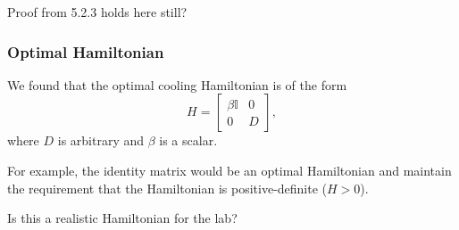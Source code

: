 \documentclass[11pt,a4paper]{article}
\numberwithin{equation}{section}
\begin{document}
	\color{blue}Proof from 5.2.3 holds here still?\color{black}	
	
	\subsubsection{Optimal Hamiltonian}
	We found that the optimal cooling Hamiltonian is of the form
	\begin{equation}\label{eq:43}
	H =
	\left[
	\begin{array}{c|c}
	\beta \mathbb{I} & 0 \\
	\hline
	0 & D
	\end{array}
	\right],
	\end{equation}where $D$ is arbitrary and $\beta$ is a scalar.
	
	For example, the identity matrix would be an optimal Hamiltonian and maintain the requirement that the Hamiltonian is positive-definite ($H>0$).
	
	\color{blue}Is this a realistic Hamiltonian for the lab?\color{black}
	
\end{document}
